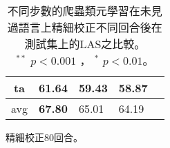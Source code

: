 \begin{table}[htbp]
\begin{subtable}[h]{0.8\textwidth}
\begin{tabular}[!ht]{c|llll}
                ta & \textbf{61.64} & 59.43 & 58.87 \\
                \hline
                avg & \textbf{67.80} & 65.01 & 64.19 \\
                \hline
            \end{tabular}
            \caption{精細校正80回合。}
        \end{subtable}
    \label{tab:delex_las_epoch_1}
    \caption{不同步數的爬蟲類元學習在未見過語言上精細校正不同回合後在測試集上的LAS之比較。\\
    ${ }^{**}$ $p < 0.001$ ， ${ }^{*}$ $p < 0.01$。}
\end{table}